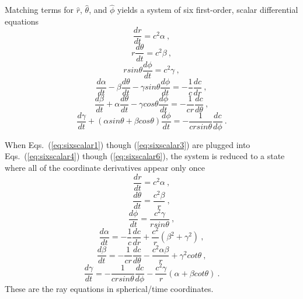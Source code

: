 \documentclass{ws-jca}
\begin{document}
Matching terms for \(\hat{r}\), \(\hat{\theta}\), and \(\hat{\phi}\) yields
a system of six first-order, scalar differential equations
\begin{equation}
\frac{dr}{dt} = c^2 \alpha \:,
\label{eq:sixscalar1}
\end{equation}
\begin{equation}
	r \frac{d\theta}{dt} = c^2 \beta \:,
	\label{eq:sixscalar2}
\end{equation}
\begin{equation}
	r sin\theta \frac{d\phi}{dt} = c^2\gamma \:,
	\label{eq:sixscalar3}
\end{equation}
\begin{equation}
	\frac{d\alpha}{dt} - \beta \frac{d\theta}{dt} 
		- \gamma sin\theta \frac{d\phi}{dt} 
		= -\frac{1}{c}\frac{dc}{dr} \:,
	\label{eq:sixscalar4}
\end{equation}
\begin{equation}
	\frac{d\beta}{dt} + \alpha \frac{d\theta}{dt} 
		- \gamma cos\theta \frac{d\phi}{dt} 
		= -\frac{1}{cr}\frac{dc}{d\theta} \:,
	\label{eq:sixscalar5}
\end{equation}
\begin{equation}
	\frac{d\gamma}{dt} + \left( \alpha sin\theta 
		+ \beta cos\theta \right) \frac{d\phi}{dt} 
		= -\frac{1}{cr sin\theta}\frac{dc}{d\phi} \:.
	\label{eq:sixscalar6}
\end{equation}

When Eqs.~(\ref{eq:sixscalar1}) though (\ref{eq:sixscalar3}) are plugged
into Eqs.~(\ref{eq:sixscalar4}) though (\ref{eq:sixscalar6}), the system is
reduced to a state where all of the coordinate derivatives appear only once
\begin{equation}
	\frac{dr}{dt} = c^2 \alpha \:,
\end{equation}
\begin{equation}
	\frac{d\theta}{dt} = \frac{c^2 \beta}{r} \:,
\end{equation}
\begin{equation}
	\frac{d\phi}{dt} = \frac{c^2\gamma}{r sin\theta} \:,
\end{equation}
\begin{equation}
	\frac{d\alpha}{dt} = -\frac{1}{c}\frac{dc}{dr} 
		+ \frac{c^2}{r}\left( \beta^2 + \gamma^2 \right) \:,
\end{equation}
\begin{equation}
	\frac{d\beta}{dt} = -\frac{1}{cr}\frac{dc}{d\theta} 
		- \frac{c^2 \alpha \beta}{r} + \gamma^2 cot\theta \:,
\end{equation}
\begin{equation}
	\frac{d\gamma}{dt} = -\frac{1}{cr sin\theta}\frac{dc}{d\phi} 
		- \frac{c^2 \gamma}{r} \left( \alpha + \beta cot\theta \right) \:.
\end{equation}
These are the ray equations in spherical/time coordinates.
\end{document}
